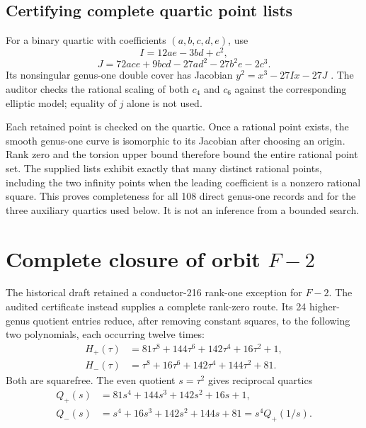 \documentclass[11pt,letterpaper]{article}
\theoremstyle{definition}\newtheorem{definition}[theorem]{Definition}
\theoremstyle{remark}\newtheorem{remark}[theorem]{Remark}
\begin{document}
\subsection{Certifying complete quartic point lists}
For a binary quartic with coefficients $(a,b,c,d,e)$, use
\[
I=12ae-3bd+c^2,
\]
\[
J=72ace+9bcd-27ad^2-27b^2e-2c^3.
\]
Its nonsingular genus-one double cover has Jacobian $y^2=x^3-27Ix-27J$ \cite[Section 2]{Fisher}. The auditor checks the rational scaling of both $c_4$ and $c_6$ against the corresponding elliptic model; equality of $j$ alone is not used.

Each retained point is checked on the quartic. Once a rational point exists, the smooth genus-one curve is isomorphic to its Jacobian after choosing an origin. Rank zero and the torsion upper bound therefore bound the entire rational point set. The supplied lists exhibit exactly that many distinct rational points, including the two infinity points when the leading coefficient is a nonzero rational square. This proves completeness for all 108 direct genus-one records and for the three auxiliary quartics used below. It is not an inference from a bounded search.

\section{Complete closure of orbit \texorpdfstring{$F{-}2$}{F-2}}\label{sec:f2}
The historical draft retained a conductor-216 rank-one exception for $F{-}2$. The audited certificate instead supplies a complete rank-zero route. Its 24 higher-genus quotient entries reduce, after removing constant squares, to the following two polynomials, each occurring twelve times:
\begin{align*}
H_+(\tau)&=81\tau^8+144\tau^6+142\tau^4+16\tau^2+1,\\
H_-(\tau)&=\tau^8+16\tau^6+142\tau^4+144\tau^2+81.
\end{align*}
Both are squarefree. The even quotient $s=\tau^2$ gives reciprocal quartics
\begin{align*}
Q_+(s)&=81s^4+144s^3+142s^2+16s+1,\\
Q_-(s)&=s^4+16s^3+142s^2+144s+81=s^4Q_+(1/s).
\end{align*}
\end{document}
